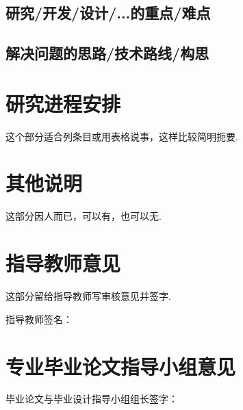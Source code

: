 \documentclass{proposal}
\begin{document}
\begin{foundation}
\zhlipsum[1]

\subsection{研究/开发/设计/...的重点/难点}

\zhlipsum[1]

\subsection{解决问题的思路/技术路线/构思}

\zhlipsum[1]

\SectionEndLine				   %
\section{研究进程安排}

这个部分适合列条目或用表格说事，这样比较简明扼要.



\SectionEndLine				   %
\section{其他说明}

这部分因人而已，可以有，也可以无.


\SectionEndLine				   %
\section{指导教师意见}

这部分留给指导教师写审核意见并签字. 
\begin{flushright}
	指导教师签名：\makebox[6em][l]{\leaderSign}\\
	\leaderSignDate
\end{flushright}



\SectionEndLine				   %
\section{专业毕业论文指导小组意见}
\vspace*{5cm}


\begin{flushright}
	毕业论文与毕业设计指导小组组长签字：\makebox[6em][l]{\leaderSign}\\
	\leaderSignDate
\end{flushright}


\end{foundation}
\end{document}
